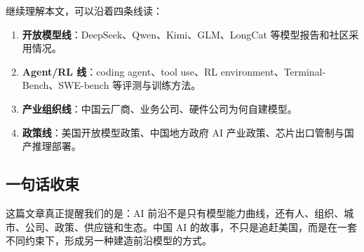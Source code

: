 \documentclass[a4paper]{article}
\begin{document}
继续理解本文，可以沿着四条线读：

\begin{enumerate}[leftmargin=1.5em]
    \item \textbf{开放模型线}：DeepSeek、Qwen、Kimi、GLM、LongCat 等模型报告和社区采用情况。
    \item \textbf{Agent/RL 线}：coding agent、tool use、RL environment、Terminal-Bench、SWE-bench 等评测与训练方法。
    \item \textbf{产业组织线}：中国云厂商、业务公司、硬件公司为何自建模型。
    \item \textbf{政策线}：美国开放模型政策、中国地方政府 AI 产业政策、芯片出口管制与国产推理部署。
\end{enumerate}

\subsection{一句话收束}

这篇文章真正提醒我们的是：AI 前沿不是只有模型能力曲线，还有人、组织、城市、公司、政策、供应链和生态。中国 AI 的故事，不只是追赶美国，而是在一套不同约束下，形成另一种建造前沿模型的方式。
\end{document}
